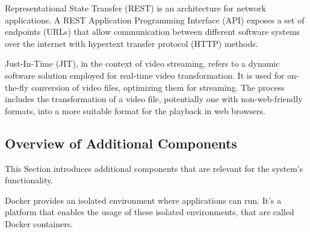\documentclass[../MasterThesis.tex]{subfiles}
\begin{document}







Representational State Transfer (REST) is an architecture for network applications. A REST Application Programming Interface (API) exposes a set of endpoints (URLs) that allow communication between different software systems over the internet with hypertext transfer protocol (HTTP) methods.~\cite{IEEE_Rest, webservice, Nodejs_Rest}



	
Just-In-Time (JIT), in the context of video streaming, refers to a dynamic software solution employed for real-time video transformation. It is used for on-the-fly conversion of video files, optimizing them for streaming. The process includes the transformation of a video file, potentially one with non-web-friendly formats, into a more suitable format for the playback in web browsers.~\cite{JIT_IEEE}



\subsection{Overview of Additional Components}
\label{subsection:overview_additional_components}


This Section introduces additional components that are relevant for the system's functionality.


Docker provides an isolated environment where applications can run. It's a platform that enables the usage of these isolated environments, that are called Docker containers.~\cite{docker}
\end{document}
